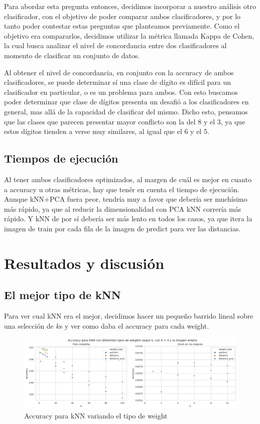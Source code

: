 \documentclass[a4paper]{article}
\begin{document}
    Para abordar esta pregunta entonces, decidimos incorporar a nuestro análisis otro clasificador, con el objetivo de poder comparar ambos clasificadores, y por lo tanto poder contestar estas preguntas que planteamos previamente. Como el objetivo era compararlos, decidimos utilizar la métrica llamada Kappa de Cohen, la cual busca analizar el nivel de concordancia entre dos clasificadores al momento de clasificar un conjunto de datos. 
    
    Al obtener el nivel de concordancia, en conjunto con la accuracy de ambos clasificadores, se puede determinar sí una clase de dígito es difícil para un clasificador en particular, o es un problema para ambos. Con esto buscamos poder determinar que clase de dígitos presenta un desafió a los clasificadores en general, mas allá de la capacidad de clasificar del mismo. Dicho esto, pensamos que las clases que parecen presentar mayor conflicto son la del 8 y el 3, ya que estos dígitos tienden a verse muy similares, al igual que el 6 y el 5.

    \subsection{Tiempos de ejecución}
    Al tener ambos clasificadores optimizados, al margen de cuál es mejor en cuanto a accuracy u otras métricas, hay que tenér en cuenta el tiempo de ejecución. Aunque kNN+PCA fuera peor, tendría muy a favor que debería ser muchísimo más rápido, ya que al reducir la dimensionalidad con PCA kNN correría más rápido. Y kNN de por sí debería ser más lento en todos los casos, ya que itera la imagen de train por cada fila de la imagen de predict para ver las distancias.

\section{Resultados y discusión}

    \subsection{El mejor tipo de kNN}
    Para ver cual kNN era el mejor, decidimos hacer un pequeño barrido lineal sobre una selección de $k$s y ver como daba el accuracy para cada weight.
    
    \begin{figure}[H]
        \begin{center}
            \includegraphics[scale=0.425]{img/exp/knn/knn_weights.png}
            \caption{Accuracy para kNN variando el tipo de weight}
            \label{exp-knn-weights}
        \end{center}
    \end{figure}
    
\end{document}
